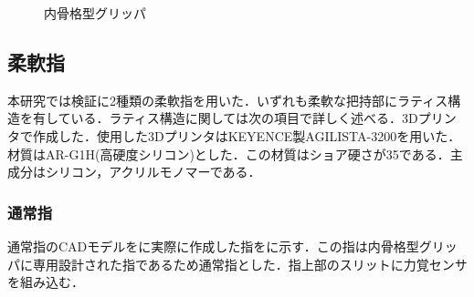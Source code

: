 \begin{figure}[h]
\hspace{5mm}

\caption{内骨格型グリッパ}
\label{fig::gripper}
\end{figure}

\subsection{柔軟指}
本研究では検証に2種類の柔軟指を用いた．いずれも柔軟な把持部にラティス構造を有している．ラティス構造に関しては次の項目で詳しく述べる．3Dプリンタで作成した．使用した3DプリンタはKEYENCE製AGILISTA-3200を用いた．材質はAR-G1H(高硬度シリコン)とした．この材質はショア硬さが35である．主成分はシリコン，アクリルモノマーである．

\subsubsection{通常指}
通常指のCADモデルをに実際に作成した指をに示す．この指は内骨格型グリッパに専用設計された指であるため通常指とした．指上部のスリットに力覚センサを組み込む．

